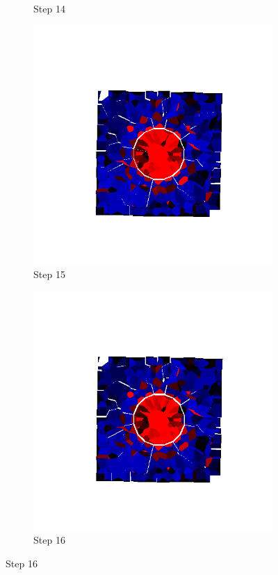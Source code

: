 \begin{figure}[ht!]
\begin{subfigure}{.25\textwidth}
      \caption{Step 14}
      \end{subfigure}%
      \begin{subfigure}{.25\textwidth}
        \centering
        \includegraphics[width=1.0\linewidth]{Files/Small_ASR/IS/DEP5-STEP(015).png}
      \caption{Step 15}
      \end{subfigure}%
      \begin{subfigure}{.25\textwidth}
        \centering
        \includegraphics[width=1.0\linewidth]{Files/Small_ASR/IS/DEP5-STEP(016).png}
      \caption{Step 16}
      \end{subfigure}


\end{figure}
